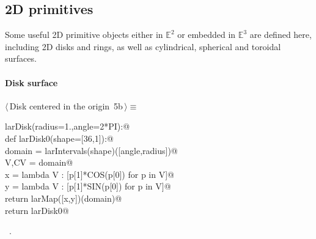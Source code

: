 \documentclass[11pt,oneside]{article}	%
\def\E{\mathbb{E}}
\begin{document}
\subsection{2D primitives}
Some useful 2D primitive objects either in $\E^2$ or embedded in $\E^3$ are defined here, including 2D disks and rings, as well as cylindrical, spherical and toroidal surfaces.

\paragraph{Disk surface}
\begin{flushleft} \small \label{scrap7}
\protect{}$\langle\,$Disk centered in the origin\nobreak\ {\footnotesize 5b}$\,\rangle\equiv$
\vspace{-1ex}
\begin{list}{}{} \item
\mbox{}\verb@def larDisk(radius=1.,angle=2*PI):@\\
\mbox{}\verb@   def larDisk0(shape=[36,1]):@\\
\mbox{}\verb@      domain = larIntervals(shape)([angle,radius])@\\
\mbox{}\verb@      V,CV = domain@\\
\mbox{}\verb@      x = lambda V : [p[1]*COS(p[0]) for p in V]@\\
\mbox{}\verb@      y = lambda V : [p[1]*SIN(p[0]) for p in V]@\\
\mbox{}\verb@      return larMap([x,y])(domain)@\\
\mbox{}\verb@   return larDisk0@\\
\mbox{}\verb@@{\NWsep}
\end{list}
\vspace{-1ex}
\footnotesize\addtolength{\baselineskip}{-1ex}
\begin{list}{}{\setlength{\itemsep}{-\parsep}\setlength{\itemindent}{-\leftmargin}}
\item \NWtxtMacroRefIn\ .
\end{list}
\end{flushleft}
\end{document}
